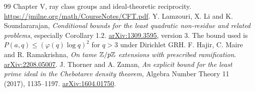 \begin{thebibliography}{99}
Chapter V, ray class groups and ideal-theoretic reciprocity.
\url{https://jmilne.org/math/CourseNotes/CFT.pdf}.
Y. Lamzouri, X. Li and K. Soundararajan,
\emph{Conditional bounds for the least quadratic non-residue and related problems},
especially Corollary 1.2.
\href{https://arxiv.org/abs/1309.3595}{arXiv:1309.3595}, version 3.
The bound used is $P(a,q)\le(\varphi(q)\log q)^2$ for $q>3$ under Dirichlet GRH.
F. Hajir, C. Maire and R. Ramakrishna,
\emph{On tame $\mathbb Z/p\mathbb Z$ extensions with prescribed ramification}.
\href{https://arxiv.org/abs/2208.05007}{arXiv:2208.05007}.
J. Thorner and A. Zaman,
\emph{An explicit bound for the least prime ideal in the Chebotarev density theorem},
Algebra Number Theory 11 (2017), 1135--1197.
\href{https://arxiv.org/abs/1604.01750}{arXiv:1604.01750}.
\end{thebibliography}
